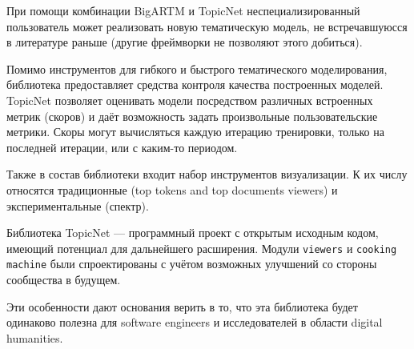 При помощи комбинации BigARTM и TopicNet неспециализированный пользователь может реализовать новую тематическую модель, не встречавшуюсся в литературе раньше (другие фреймворки не позволяют этого добиться).


Помимо инструментов для гибкого и быстрого тематического моделирования, библиотека предоставляет средства контроля качества построенных моделей. TopicNet позволяет оценивать модели посредством различных встроенных метрик (скоров) и даёт возможность задать произвольные пользовательские метрики. Скоры могут вычисляться каждую итерацию тренировки, только на последней итерации, или с каким-то периодом. 

Также в состав библиотеки входит набор инструментов визуализации. К их числу относятся традиционные (top tokens and top documents viewers) и экспериментальные (спектр).

Библиотека TopicNet --- программный проект с открытым исходным кодом, имеющий потенциал для дальнейшего расширения. Модули \texttt{viewers} и \texttt{cooking machine} были спроектированы с учётом возможных улучшений со стороны сообщества в будущем.

Эти особенности дают основания верить в то, что эта библиотека будет одинаково полезна для software engineers и исследователей в области digital humanities.

